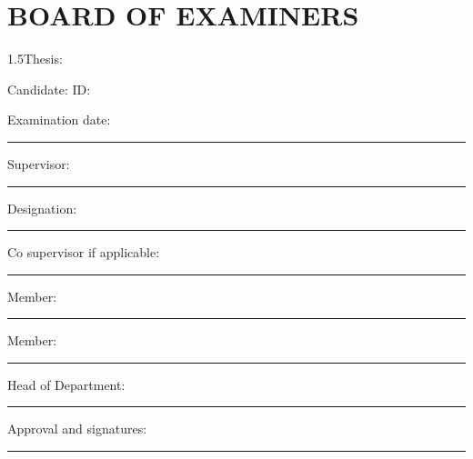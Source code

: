 \chapter*{BOARD OF EXAMINERS}
\begin{spacing}{1.5}Thesis: \textbf{\thesistitle}\par
Candidate: \studentOneName\quad ID: \studentOneID\par
Examination date: \rule{5cm}{0.4pt}\par\bigskip
\noindent Supervisor: \rule{8cm}{0.4pt}\par\bigskip
\noindent Designation: \rule{8cm}{0.4pt}\par\bigskip
\noindent Co supervisor if applicable: \rule{6cm}{0.4pt}\par\bigskip
\noindent Member: \rule{8cm}{0.4pt}\par\bigskip
\noindent Member: \rule{8cm}{0.4pt}\par\bigskip
\noindent Head of Department: \rule{7cm}{0.4pt}\par\bigskip
\noindent Approval and signatures: \rule{7cm}{0.4pt}
\end{spacing}